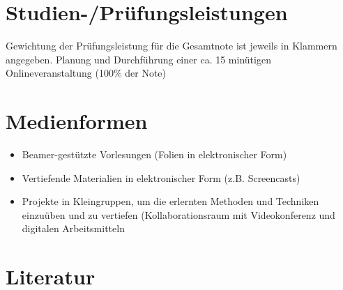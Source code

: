 \section*{Studien-/Prüfungsleistungen\label{/mi-2017/modulbeschreibungen-master/MA_SC_WPF_CSCL}}\label{studien-pruxfcfungsleistungenpathlabelmi-2017modulbeschreibungen-mastermaux5fscux5fwpfux5fcscl}

Gewichtung der Prüfungsleistung für die Gesamtnote ist jeweils in
Klammern angegeben. Planung und Durchführung einer ca. 15 minütigen
Onlineveranstaltung (100\% der Note)

\section*{Medienformen\label{/mi-2017/modulbeschreibungen-master/MA_SC_WPF_CSCL}}\label{medienformenpathlabelmi-2017modulbeschreibungen-mastermaux5fscux5fwpfux5fcscl}

\begin{itemize}
\tightlist
\item
  Beamer-gestützte Vorlesungen (Folien in elektronischer Form)
\item
  Vertiefende Materialien in elektronischer Form (z.B. Screencasts)
\item
  Projekte in Kleingruppen, um die erlernten Methoden und Techniken
  einzuüben und zu vertiefen (Kollaborationsraum mit Videokonferenz und
  digitalen Arbeitsmitteln
\end{itemize}

\section*{Literatur\label{/mi-2017/modulbeschreibungen-master/MA_SC_WPF_CSCL}}\label{literaturpathlabelmi-2017modulbeschreibungen-mastermaux5fscux5fwpfux5fcscl}

